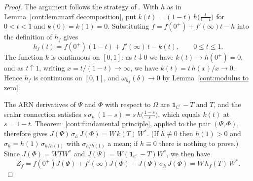 \begin{proof}
The argument follows the strategy of \cite[Lemma~5]{FangFawzi2021}. With $h$ as in Lemma~\ref{cont:lem:maxf decomposition}, put
$k(t)=(1-t)\,h\big(\tfrac{t}{1-t}\big)$ for $0<t<1$ and $k(0)=k(1)=0$. Substituting $f=f(0^+)+f'(\infty)t-h$ into
the definition of $h_f$ gives
\[
h_f(t)=f(0^+)(1-t)+f'(\infty)\,t-k(t),\qquad 0\leq t\leq 1 .
\]
The function $k$ is continuous on $[0,1]$: as $t\downarrow0$ we have $k(t)\to h(0^+)=0$, and as $t\uparrow1$, writing
$x=t/(1-t)\to\infty$, we have $k(t)=t\,h(x)/x\to0$. Hence $h_f$ is continuous on $[0,1]$, and
$\omega_{h_f}(\delta)\to0$ by Lemma~\ref{cont:modulus to zero}.
 
 The ARN derivatives of $\Psi$ and $\Phi$ with respect to $\Omega$ are
$\mathbf{1}_{\mathbb{C}^r}-T$ and $T$, and the scalar connection satisfies $s\,\sigma_h\,(1-s)=s\,h\big(\tfrac{1-s}{s}\big)$, which equals
$k(t)$ at $s=1-t$. Theorem~\ref{cont:fundamental principle}, applied to the pair $(\Psi,\Phi)$, therefore gives
$J(\Psi)\,\sigma_h\,J(\Phi)=W\,k(T)\,W^*$. (If $h\not\equiv0$ then $h(1)>0$ and $\sigma_h=h(1)\,\sigma_{h/h(1)}$ with
$\sigma_{h/h(1)}$ a mean; if $h\equiv0$ there is nothing to prove.) Since $J(\Phi)=WTW^*$ and
$J(\Psi)=W(\mathbf{1}_{\mathbb{C}^r}-T)W^*$, we then have
\[
Z_f=f(0^+)J(\Psi)+f'(\infty)J(\Phi)-J(\Psi)\,\sigma_h\,J(\Phi)=W\,h_f(T)\,W^* .
\]
 

\end{proof}
